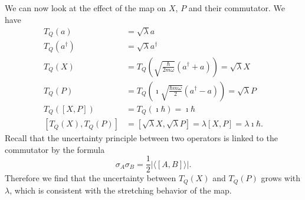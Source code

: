 \documentclass{SciPost}
\begin{document}
We can now look at the effect of the map on $X$, $P$ and their commutator. We have
\begin{align}
	T_Q(a) &= \sqrt{\lambda} a \\ 
	T_Q(a^\dagger) &= \sqrt{\lambda} a^\dagger \\ 
	T_Q(X) &= T_Q\left(\sqrt{\frac{\hbar}{2m\omega}}(a^\dagger + a)\right) = \sqrt{\lambda} X \\
	T_Q(P) &= T_Q\left(\imath\sqrt{\frac{\hbar m \omega}{2}}(a^\dagger - a)\right) = \sqrt{\lambda} P \\
	T_Q([X, P]) &= T_Q(\imath \hbar) = \imath \hbar \\
	[T_Q(X), T_Q(P)] &= [ \sqrt{\lambda} X, \sqrt{\lambda} P] = \lambda [X, P] = \lambda \imath \hbar.
\end{align}
Recall that the uncertainty principle between two operators is linked to the commutator by the formula
\begin{equation}
	\sigma_A \sigma_B = \frac{1}{2} | \langle [A,B] \rangle |.
\end{equation}
Therefore we find that the uncertainty between $T_Q(X)$ and $T_Q(P)$ grows with $\lambda$, which is consistent with the stretching behavior of the map.
\end{document}
